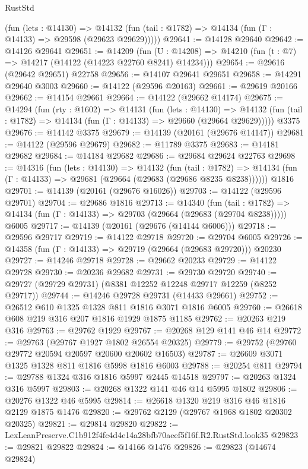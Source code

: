 \begin{lexlean}{RustStd}
\begin{coremodule}
      (fun (lets : @14130) =>
      @14132 (fun (tail : @1782) => @14134 (fun (Γ : @14133) => @29598 (@29623 @29629)))))
@29641 := @14128 @29640
@29642 := @14126 @29641
@29651 := @14209
    (fun (U : @14208) => @14210 (fun (t : @7) => @14217 (@14122 (@14223 @22760 @8241) @14234)))
@29654 := @29616 (@29642 @29651) @22758
@29656 := @14107 @29641 @29651
@29658 := @14291 @29640 @3003
@29660 := @14122 (@29596 @20163)
@29661 := @29619 @20166
@29662 := @14154 @29661
@29664 := @14122 (@29662 @14174)
@29675 := @14294
    (fun (rty : @1602) =>
    @14131
      (fun (lets : @14130) =>
      @14132 (fun (tail : @1782) => @14134 (fun (Γ : @14133) => @29660 (@29664 @29629)))))
    @3375
@29676 := @14142 @3375
@29679 := @14139 (@20161 (@29676 @14147))
@29681 := @14122 (@29596 @29679)
@29682 := @11789 @3375
@29683 := @14181 @29682
@29684 := @14184 @29682
@29686 := @29684 @29624 @22763
@29698 := @14316
    (fun (lets : @14130) =>
    @14132
      (fun (tail : @1782) =>
      @14134 (fun (Γ : @14133) => @29681 (@29664 (@29683 (@29686 @8235 @8238))))))
    @1816
@29701 := @14139 (@20161 (@29676 @16026))
@29703 := @14122 (@29596 @29701)
@29704 := @29686 @1816
@29713 := @14340
    (fun (tail : @1782) => @14134 (fun (Γ : @14133) => @29703 (@29664 (@29683 (@29704 @8238)))))
    @6005
@29717 := @14139 (@20161 (@29676 (@14144 @6006)))
@29718 := @29596 @29717
@29719 := @14122 @29718
@29720 := @29704 @6005
@29726 := @14358 (fun (Γ : @14133) => @29719 (@29664 (@29683 @29720))) @20230
@29727 := @14246 @29718
@29728 := @29662 @20233
@29729 := @14122 @29728
@29730 := @20236 @29682
@29731 := @29730 @29720
@29740 := @29727 (@29729 @29731) (@8381 @12252 @12248 @29717 @12259 (@8252 @29717))
@29744 := @14246 @29728 @29731 (@14433 @29661)
@29752 := @26512 @610 @1325 @1328 @811 @1816 @3071 @1816 @6005
@29760 := @26618 @608 @219 @316 @207 @1816 @1929 @1875 @1185
@29762 := @20263 @219 @316
@29763 := @29762 @1929
@29767 := @20268 @129 @141 @46 @14
@29772 := @29763 (@29767 @1927 @1802 @26554 @20325)
@29779 := @29752 (@29760 @29772 @20594 @20597 @20600 @20602 @16503)
@29787 := @26609 @3071 @1325 @1328 @811 @1816 @5998 @1816 @6003
@29788 := @20254 @811
@29794 := @29788 @1324 @316 @1816 @5997 @2445 @14518
@29797 := @20263 @1324 @316 @5997
@29803 := @20268 @1322 @141 @46 @14 @5995 @1802
@29806 := @20276 @1322 @46 @5995
@29814 := @26618 @1320 @219 @316 @46 @1816 @2129 @1875 @1476
@29820 := @29762 @2129 (@29767 @1968 @1802 @20302 @20325)
@29821 := @29814 @29820
@29822 := LexLeanPreserve.C1b912f4fc4d4e14a28bfb70aeef5f16f.R2.RustStd.look35
@29823 := @29821 @29822
@29824 := @14166 @1476
@29826 := @29823 (@14674 @29824)

\end{coremodule}
\end{lexlean}
